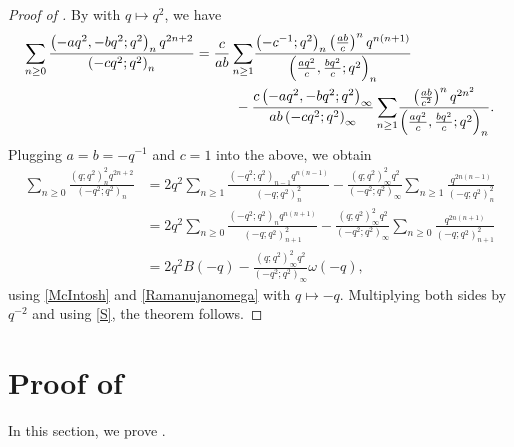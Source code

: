 \documentclass[12pt,reqno]{amsart}
\renewcommand{\o}{{\omega}}
\renewcommand{\(}{\left\(}
\renewcommand{\)}{\right\)}
\newcommand{\pa}[2]{\left(\frac{#1}{#2}\right)}
\numberwithin{equation}{section}
\theoremstyle{plain}
\theoremstyle{definition}
\numberwithin{equation}{section}
\begin{document}
\begin{proof}[Proof of ]
By  with $q\mapsto q^2$, we have
\begin{align*}
\sum_{n\ge 0}\frac{\left(-aq^2,-bq^2;q^2\right)_nq^{2n+2}}{\left(-cq^2;q^2\right)_n}
&=\frac{c}{ab}\sum_{n\ge 1}\!\frac{\left(-c^{-1};q^2\right)_n \pa{ab}{c}^n q^{n(n+1)}}{\left(\frac{aq^2}{c},\frac{bq^2}{c};q^2\right)_n}\\
&\hspace{1 cm}-\frac{c\left(-aq^2,-bq^2;q^2\right)_{\infty}}{ab\left(-cq^2;q^2\right)_{\infty}}\sum_{n\ge 1}\!\frac{\pa{ab}{c^2}^nq^{2n^2}}{\left(\frac{aq^2}{c},\frac{bq^2}{c};q^2\right)_n}.
\end{align*}
Plugging $a=b=-q^{-1}$ and $c=1$ into the above, we obtain 
\begin{align*}
\sum_{n\ge 0}\frac{\left(q;q^2\right)^2_nq^{2n+2}}{\left(-q^2;q^2\right)_n}
&=2q^2\sum_{n\ge 1}\!\frac{\left(-q^2;q^2\right)_{n-1} q^{n(n-1)}}{\left(-q;q^2\right)^2_n}-\frac{\left(q;q^2\right)^2_{\infty}q^2}{\left(-q^2;q^2\right)_{\infty}}\sum_{n\ge 1}\!\frac{q^{2n(n-1)}}{\left(-q;q^2\right)^2_n}\\
&=2q^2\sum_{n\ge 0}\!\frac{\left(-q^2;q^2\right)_{n} q^{n(n+1)}}{\left(-q;q^2\right)^2_{n+1}}-\frac{\left(q;q^2\right)^2_{\infty}q^2}{\left(-q^2;q^2\right)_{\infty}}\sum_{n\ge 0}\!\frac{q^{2n(n+1)}}{\left(-q;q^2\right)^2_{n+1}}\\
&=2q^2B(-q)-\frac{\left(q;q^2\right)^2_{\infty}q^2}{\left(-q^2;q^2\right)_{\infty}}\o(-q),
\end{align*}
using \eqref{McIntosh} and \eqref{Ramanujanomega} with $q\mapsto -q$. Multiplying both sides by $q^{-2}$ and using \eqref{S}, the theorem follows.\qedhere 
\end{proof}



\section{Proof of }\label{sec3}

 In this section, we prove .
\end{document}
